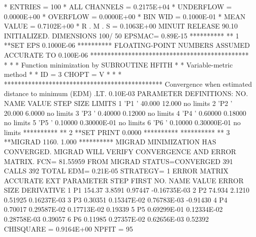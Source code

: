 \begin{Listing}
 * ENTRIES =        100      * ALL CHANNELS = 0.2175E+04      * UNDERFLOW = 0.0000E+00      * OVERFLOW = 0.0000E+00
 * BIN WID = 0.1000E-01      * MEAN VALUE   = 0.7102E+00      * R . M . S = 0.1063E+00
\newpage
  MINUIT RELEASE 90.10  INITIALIZED.   DIMENSIONS 100/ 50  EPSMAC=  0.89E-15
 **********
 **    1 **SET EPS  0.1000E-06
 **********
 FLOATING-POINT NUMBERS ASSUMED ACCURATE TO   0.100E-06
     **********************************************
     *                                            *
     * Function minimization by SUBROUTINE HFITH  *
     * Variable-metric method                     *
     * ID =          3  CHOPT = V                 *
     *                                            *
     **********************************************
 Convergence when estimated distance to minimum (EDM) .LT.  0.10E-03
 PARAMETER DEFINITIONS:
    NO.   NAME         VALUE      STEP SIZE      LIMITS
     1 'P1        '    40.000       12.000         no limits
     2 'P2        '    20.000       6.0000         no limits
     3 'P3        '   0.40000      0.12000         no limits
     4 'P4        '   0.60000      0.18000         no limits
     5 'P5        '   0.10000      0.30000E-01     no limits
     6 'P6        '   0.10000      0.30000E-01     no limits
 **********
 **    2 **SET PRINT  0.0000    
 **********
 **********
 **    3 **MIGRAD   1160.       1.000    
 **********
 MIGRAD MINIMIZATION HAS CONVERGED.
 MIGRAD WILL VERIFY CONVERGENCE AND ERROR MATRIX.
 FCN=   81.55959     FROM MIGRAD    STATUS=CONVERGED    391 CALLS      392 TOTAL
                     EDM=  0.21E-05    STRATEGY= 1      ERROR MATRIX ACCURATE 
  EXT PARAMETER                                   STEP         FIRST   
  NO.   NAME        VALUE          ERROR          SIZE      DERIVATIVE 
   1      P1        154.37        3.8591       0.97447      -0.16735E-03
   2      P2        74.934        2.1210       0.51925       0.16237E-03
   3      P3       0.30351       0.15347E-02   0.76783E-03  -0.91430    
   4      P4       0.70017       0.29587E-02   0.17713E-02   0.19339    
   5      P5       0.69299E-01   0.12334E-02   0.28758E-03   0.39057    
   6      P6       0.11985       0.27357E-02   0.62656E-03   0.52392    
 CHISQUARE = 0.9164E+00  NPFIT =   95


\end{Listing}
